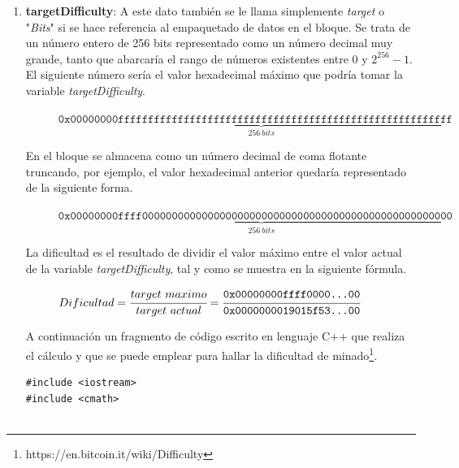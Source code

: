 \documentclass{article}
\begin{document}
\begin{enumerate}
\begin{verbatim}
    printf("Timestamp epoch: %ld\n", (long) tod);
}
        \end{verbatim}
        
    
        \item \textbf{targetDifficulty}: A este dato también se le llama simplemente \textit{target} o "\textit{Bits}" si se hace referencia al empaquetado de datos en el bloque. Se trata de un número entero de 256 bits representado como un número decimal muy grande, tanto que abarcaría el rango de números existentes entre $0$ y $2^{256}-1$. El siguiente número sería el valor hexadecimal máximo que podría tomar la variable \textit{targetDifficulty}.
        
            \begin{figure}[H]
                \centering
                \scriptsize{
                $\texttt{0x}\underbrace{\texttt{00000000ffffffffffffffffffffffffffffffffffffffffffffffffffffffff}}_{256\ bits}$
                }
            \end{figure}
        
        En el bloque se almacena como un número decimal de coma flotante truncando, por ejemplo, el valor hexadecimal anterior quedaría representado de la siguiente forma.
        
            \begin{figure}[H]
                \centering
                \scriptsize{
                $\texttt{0x}\underbrace{\texttt{00000000ffff0000000000000000000000000000000000000000000000000000}}_{256\ bits}$
                }
            \end{figure}
        
        La dificultad es el resultado de dividir el valor máximo entre el valor actual de la variable \textit{targetDifficulty}, tal y como se muestra en la siguiente fórmula.
        
            \begin{figure}[H]
                \centering
                $Dificultad = \cfrac{target \ maximo}{target \ actual} = \cfrac{\texttt{0x00000000ffff0000...00}}{\texttt{0x0000000019015f53...00}}$
            \end{figure}
        
        A continuación un fragmento de código escrito en lenguaje C++ que realiza el cálculo y que se puede emplear para hallar la dificultad de minado\footnote{https://en.bitcoin.it/wiki/Difficulty}.
        
        \begin{verbatim}
#include <iostream>
#include <cmath>


\end{verbatim}
\end{enumerate}
\end{document}
